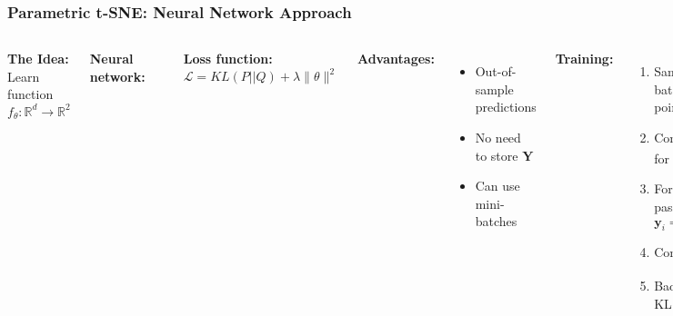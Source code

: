 \documentclass[aspectratio=169]{beamer}
\begin{document}
\begin{frame}
\frametitle{Parametric t-SNE: Neural Network Approach}
\begin{columns}[T]
\textbf{The Idea:}\\
Learn function $f_\theta: \mathbb{R}^d \to \mathbb{R}^2$

\vspace{0.3cm}
\textbf{Neural network:}
\begin{center}
\end{center}

\textbf{Loss function:}
$$\mathcal{L} = KL(P||Q) + \lambda \|\theta\|^2$$

\textbf{Advantages:}
\begin{itemize}
\small
\item Out-of-sample predictions
\item No need to store $\mathbf{Y}$
\item Can use mini-batches
\end{itemize}

\vspace{0.3cm}
\textbf{Training:}
\begin{enumerate}
\small
\item Sample batch of points
\item Compute $p_{ij}$ for batch
\item Forward pass: $\mathbf{y}_i = f_\theta(\mathbf{x}_i)$
\item Compute $q_{ij}$
\item Backprop KL gradient
\end{enumerate}

\vspace{0.3cm}
\textbf{Limitation:}\\
\small Less flexible than non-parametric
\end{columns}
\end{frame}
\end{document}
